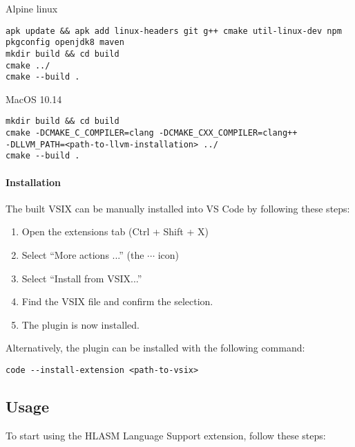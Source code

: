 \pagebreak
{Alpine linux}
\begin{listing}[H]
\begin{verbatim}
apk update && apk add linux-headers git g++ cmake util-linux-dev npm
pkgconfig openjdk8 maven
mkdir build && cd build
cmake ../
cmake --build .
\end{verbatim}
\end{listing}

{MacOS 10.14}
\begin{listing}[H]
\begin{verbatim}
mkdir build && cd build
cmake -DCMAKE_C_COMPILER=clang -DCMAKE_CXX_COMPILER=clang++
-DLLVM_PATH=<path-to-llvm-installation> ../
cmake --build .
\end{verbatim}
\end{listing}

\paragraph*{Installation}
The built VSIX can be manually installed into VS Code by following these steps:
\begin{enumerate}
	\item Open the extensions tab (Ctrl + Shift + X)
	\item Select ``More actions ...'' (the $\cdots$ icon)
	\item Select ``Install from VSIX...''
	\item Find the VSIX file and confirm the selection.
	\item The plugin is now installed.
\end{enumerate}

Alternatively, the plugin can be installed with the following command:
\begin{listing}[H]
\begin{verbatim}
code --install-extension <path-to-vsix>
\end{verbatim}
\end{listing}

\subsection{Usage}
To start using the HLASM Language Support extension, follow these steps:

